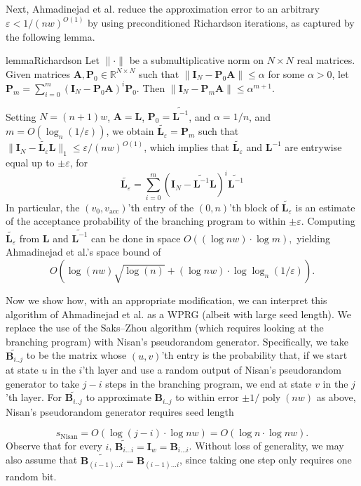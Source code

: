 \documentclass[11pt]{article}
\numberwithin{equation}{section}
\theoremstyle{definition}
\theoremstyle{plain}
\newcommand{\R}{\mathbb R}
\newcommand{\eps}{\varepsilon}
\newcommand{\mB}{\mathbf{B}}
\newcommand{\mA}{\mathbf{A}}
\newcommand{\mP}{\mathbf{P}}
\newcommand{\mL}{\mathbf{L}}
\newcommand{\I}{\mathbf{I}}
\newcommand{\Pm}{\mathbf{P}_m}
\newcommand{\vac}{v_{\text{acc}}}
\newcommand{\poly}{\operatorname{poly}}
\newcommand{\Lt}{\widetilde{\mathbf{L}^{-1}}}
\newcommand{\Lte}{\widetilde{\mathbf{L}_{\eps}}}
\newcommand{\sNisan}{s_{\mathrm{Nisan}}}
\begin{document}
   Next, %
Ahmadinejad  %
et al. reduce the approximation error to an arbitrary $\eps<1/(nw)^{O(1)}$ by using preconditioned Richardson iterations, as captured by the following lemma. %
   
   
    \begin{restatable}{lemma}{Richardson}
    \label{lem:richardson}
    Let $\|\cdot\|$ be a submultiplicative norm on $N\times N$ real matrices. Given matrices $\mA,\mP_0\in \R^{N\times N}$ such that $\|\I_N-\mP_0\mA\|\leq \alpha$ for some $\alpha >0$, let $\Pm=\sum_{i=0}^m(\I_N-\mP_0\mA)^i\mP_0$. Then $\|\I_N-\Pm \mA\|\leq \alpha^{m+1}$.
    \end{restatable}
    
    Setting $N=(n+1)w$, $\mA=\mL$, $\mP_0=\Lt$, and $\alpha=1/n$, and
    $m=O(\log_{n}(1/\eps))$, we obtain $\Lte=\Pm$ such that
    $\|\I_N-\Lte \mL\|_1\leq \eps/(nw)^{O(1)}$, which implies that $\Lte$ and $\mL^{-1}$ are entrywise equal up to $\pm \eps$, for
    \begin{equation}
        \Lte = \sum_{i=0}^m(\I_N-\Lt\mL)^i\Lt \label{eqn:iterated_L}
    \end{equation}
    In particular, the $(v_0,\vac)$'th entry of the $(0,n)$'th block of $\Lte$ is an estimate of the acceptance probability of the branching program to within $\pm \eps$.  Computing $\Lte$ from $\mL$ and $\Lt$ 
    can be done in space $O((\log nw)\cdot \log m),$ yielding 
%
Ahmadinejad  %
et al.'s space bound of 
    $$O(\log(nw)\sqrt{\log(n)} + (\log nw)\cdot \log \log_{n}(1/\eps)).$$
    
Now we show how, with an appropriate modification, we can interpret this algorithm of
%
Ahmadinejad  %
et al. as a WPRG (albeit with large seed length).
    We replace the use of the Saks--Zhou algorithm (which requires looking at the branching program) with Nisan's pseudorandom generator.  Specifically, we take 
    $\widetilde{\mB_{i .. j}}$ to be the matrix whose $(u,v)$'th entry
    is the probability that, if we start at state $u$ in %
    the $i$'th layer and
    use a random output of Nisan's pseudorandom generator to take $j-i$ steps in the branching program, we end at state $v$ in the $j$'th layer.  For 
    $\widetilde{\mB_{i .. j}}$ to approximate $\mB_{i .. j}$ to within error $\pm 1/\poly(nw)$ as above, Nisan's pseudorandom generator requires seed length 
    
    $$\sNisan = O(\log(j-i)\cdot \log nw) = O(\log n\cdot \log nw).$$
    Observe that for every $i$, $\widetilde{\mB_{i\ldots i}} = \I_w = \mB_{i\ldots i}$. Without loss of generality, we may also assume that
    $\widetilde{\mB_{(i-1)\ldots i}}=\mB_{(i-1)\ldots i}$, since taking one step only requires one random bit.  
    
\end{document}
